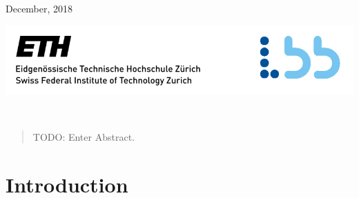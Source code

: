 \begin{titlepage}

{\large December, 2018}\\[2cm] %

\centerline{\includegraphics[scale=0.9]{./pic/ETH_LBB.PNG}}


 

\vfill %

\end{titlepage}
\

\begin{abstract}
TODO: Enter Abstract.
\end{abstract}

\newpage

\tableofcontents

\newpage



\section{Introduction}







\clearpage
{}











